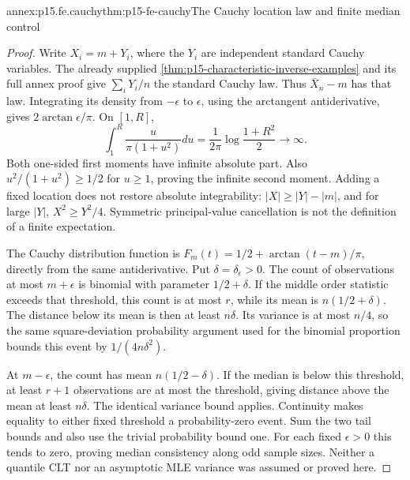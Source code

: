 \begin{annexitem}{annex:p15.fe.cauchy}{thm:p15-fe-cauchy}{The Cauchy location law and finite median control}
\begin{proof}
Write \(X_i=m+Y_i\), where the \(Y_i\) are independent standard
Cauchy variables. The already supplied
\cref{thm:p15-characteristic-inverse-examples} and its full annex proof
give \(\sum_iY_i/n\) the standard Cauchy law. Thus
\(\overline X_n-m\) has that law. Integrating its density from
\(-\epsilon\) to \(\epsilon\), using the arctangent antiderivative,
gives \(2\arctan\epsilon/\pi\).
On \([1,R]\),
\[
 \int_1^R\frac{u}{\pi(1+u^2)}du
       =\frac1{2\pi}\log\frac{1+R^2}{2}\longrightarrow\infty.
\]
Both one-sided first moments have infinite absolute part. Also
\(u^2/(1+u^2)\geq1/2\) for \(u\geq1\), proving the infinite
second moment. Adding a fixed location does not restore absolute
integrability: \(|X|\geq|Y|-|m|\), and for large \(|Y|\),
\(X^2\geq Y^2/4\). Symmetric principal-value cancellation is
not the definition of a finite expectation.

The Cauchy distribution function is
\(F_m(t)=1/2+\arctan(t-m)/\pi\), directly from the same
antiderivative. Put \(\delta=\delta_\epsilon>0\).
The count of observations at most \(m+\epsilon\) is binomial
with parameter \(1/2+\delta\). If the middle order statistic
exceeds that threshold, this count is at most \(r\), while its
mean is \(n(1/2+\delta)\). The distance below its mean is then
at least \(n\delta\). Its variance is at most \(n/4\), so the
same square-deviation probability argument used for the binomial
proportion bounds this event by \(1/(4n\delta^2)\).

At \(m-\epsilon\), the count has mean \(n(1/2-\delta)\).
If the median is below this threshold, at least \(r+1\)
observations are at most the threshold, giving distance above the
mean at least \(n\delta\). The identical variance bound applies.
Continuity makes equality to either fixed threshold a probability-zero
event. Sum the two tail bounds and also use the trivial probability
bound one. For each fixed \(\epsilon>0\) this tends to zero,
proving median consistency along odd sample sizes. Neither a quantile
CLT nor an asymptotic MLE variance was assumed or proved here.
\end{proof}
\end{annexitem}
